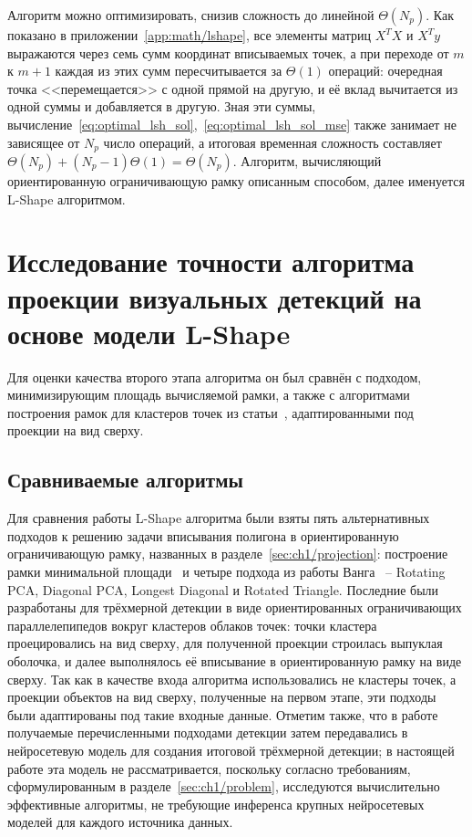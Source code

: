 Алгоритм можно оптимизировать, снизив сложность до линейной $\Theta(N_p)$. Как показано в приложении~\cref{app:math/lshape}, все элементы матриц $X^TX$ и $X^Ty$ выражаются через семь сумм координат вписываемых точек, а при переходе от $m$ к $m+1$ каждая из этих сумм пересчитывается за $\Theta(1)$ операций: очередная точка <<перемещается>> с одной прямой на другую, и её вклад вычитается из одной суммы и добавляется в другую. Зная эти суммы, вычисление~\cref{eq:optimal_lsh_sol},~\cref{eq:optimal_lsh_sol_mse} также занимает не зависящее от $N_p$ число операций, а итоговая временная сложность составляет $\Theta(N_p) + (N_p-1)\Theta(1) = \Theta(N_p)$. Алгоритм, вычисляющий ориентированную ограничивающую рамку описанным способом, далее именуется L-Shape алгоритмом.

\section{Исследование точности алгоритма проекции визуальных детекций на основе модели L-Shape}\label{sec:ch2/sec2}

Для оценки качества второго этапа алгоритма он был сравнён с подходом, минимизирующим площадь вычисляемой рамки, а также с алгоритмами построения рамок для кластеров точек из статьи~\cite{Wang2021}, адаптированными под проекции на вид сверху. 

\subsection{Сравниваемые алгоритмы}

Для сравнения работы L-Shape алгоритма были взяты пять альтернативных подходов к решению задачи вписывания полигона в ориентированную ограничивающую рамку, названных в разделе~\cref{sec:ch1/projection}: построение рамки минимальной площади~\cite{arnon1983linear} и четыре подхода из работы Ванга~\cite{Wang2021} -- Rotating PCA, Diagonal PCA, Longest Diagonal и Rotated Triangle. Последние были разработаны для трёхмерной детекции в виде ориентированных ограничивающих параллелепипедов вокруг кластеров облаков точек: точки кластера проецировались на вид сверху, для полученной проекции строилась выпуклая оболочка, и далее выполнялось её вписывание в ориентированную рамку на виде сверху. Так как в качестве входа алгоритма использовались не кластеры точек, а проекции объектов на вид сверху, полученные на первом этапе, эти подходы были адаптированы под такие входные данные. Отметим также, что в работе~\cite{Wang2021} получаемые перечисленными подходами детекции затем передавались в нейросетевую модель для создания итоговой трёхмерной детекции; в настоящей работе эта модель не рассматривается, поскольку согласно требованиям, сформулированным в разделе~\cref{sec:ch1/problem}, исследуются вычислительно эффективные алгоритмы, не требующие инференса крупных нейросетевых моделей для каждого источника данных.


